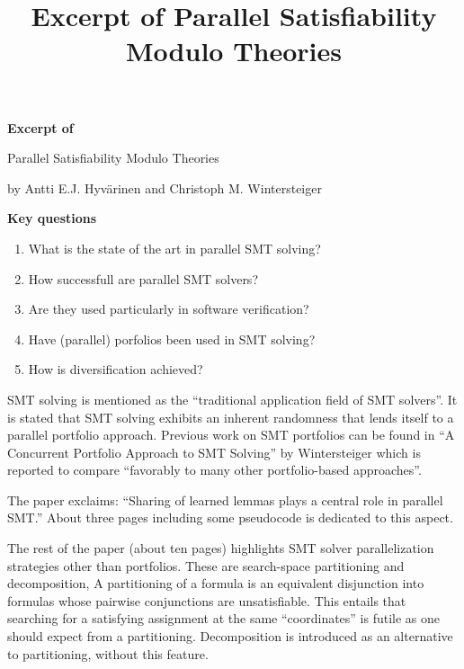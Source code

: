 \documentclass{scrartcl}
\title{Excerpt of Parallel Satisﬁability Modulo Theories}
\begin{document}
\begin{center}
    \Large{\textbf{Excerpt of}}

    \LARGE{Parallel Satisﬁability Modulo Theories}

    \large{by Antti E.J. Hyvärinen and Christoph M. Wintersteiger}
\end{center}

\vspace{1cm}

\begin{addmargin}[0.2\linewidth]{0.2\linewidth}
    \begin{center}
        \textbf{Key questions}
    \end{center}
    \begin{enumerate}[i]
        \item What is the state of the art in parallel SMT solving?
        \item How successfull are parallel SMT solvers?
        \item Are they used particularly in software verification?
        \item Have (parallel) porfolios been used in SMT solving?
        \item How is diversification achieved?
    \end{enumerate}
\end{addmargin}

\vspace{1cm}

SMT solving is mentioned as the \enquote{traditional application field of SMT solvers}.
It is stated that SMT solving exhibits an inherent randomness
that lends itself to a parallel portfolio approach.
Previous work on SMT portfolios can be found in
\enquote{A Concurrent Portfolio Approach to SMT Solving} by Wintersteiger
which is reported to compare \enquote{favorably to many other portfolio-based approaches}.


The paper exclaims:
\enquote{Sharing of learned lemmas plays a central role in parallel SMT.}
About three pages including some pseudocode is dedicated to this aspect.

The rest of the paper (about ten pages) highlights SMT solver parallelization strategies
other than portfolios.
These are search-space partitioning and decomposition,
A partitioning of a formula is an equivalent disjunction into formulas
whose pairwise conjunctions are unsatisfiable.
This entails that searching for a satisfying assignment at the same \enquote{coordinates}
is futile as one should expect from a partitioning.
Decomposition is introduced as an alternative to partitioning,
without this feature.

\end{document}
